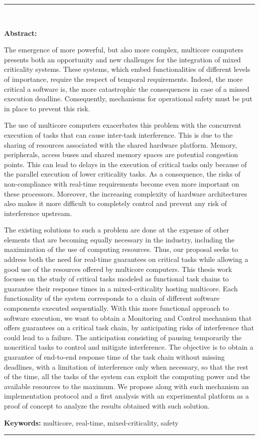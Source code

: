 \documentclass[french, a4paper, 11pt, twoside, pdftex]{StyleThese}
\begin{document}
\begin{vcenterpage}
\noindent\rule[2pt]{\textwidth}{0.5pt}
\\
	{\large\textbf{Abstract:} 
		
		The emergence of more powerful, but also more complex, multicore computers presents both an opportunity and new challenges for the integration of mixed criticality systems. These systems, which embed functionalities of different levels of importance, require the respect of temporal requirements. Indeed, the more critical a software is, the more catastrophic the consequences in case of a missed execution deadline. Consequently, mechanisms for operational safety must be put in place to prevent this risk. 

		The use of multicore computers exacerbates this problem with the concurrent execution of tasks that can cause inter-task interference. This is due to the sharing of resources associated with the shared hardware platform. Memory, peripherals, access buses and shared memory spaces are potential congestion points. This can lead to delays in the execution of critical tasks only because of the parallel execution of lower criticality tasks. As a consequence, the risks of non-compliance with real-time requirements become even more important on these processors. Moreover, the increasing complexity of hardware architectures also makes it more difficult to completely control and prevent any risk of interference upstream.

		The existing solutions to such a problem are done at the expense of other elements that are becoming equally necessary in the industry, including the maximization of the use of computing resources. Thus, our proposal seeks to address both the need for real-time guarantees on critical tasks while allowing a good use of the resources offered by multicore computers. This thesis work focuses on the study of critical tasks modeled as functional task chains to guarantee their response times in a mixed-criticality hosting multicore. Each functionality of the system corresponds to a chain of different software components executed sequentially. With this more functional approach to software execution, we want to obtain a Monitoring and Control mechanism that offers guarantees on a critical task chain, by anticipating risks of interference that could lead to a failure. The anticipation consisting of pausing temporarily the noncritical tasks to control and mitigate interference. The objective is to obtain a guarantee of end-to-end response time of the task chain without missing deadlines, with a limitation of interference only when necessary, so that the rest of the time, all the tasks of the system can exploit the computing power and the available resources to the maximum. 
		We propose along with such mechanism an implementation protocol and a first analysis with an experimental platform as a proof of concept to analyze the results obtained with such solution.
	}
	\smallbreak
	{\large\textbf{Keywords:} multicore, real-time, mixed-criticality, safety}
\\
\noindent\rule[2pt]{\textwidth}{0.5pt}
\end{vcenterpage}
\end{document}
